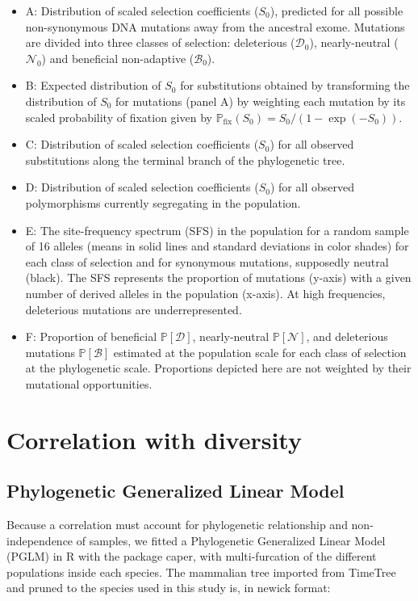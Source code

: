 \documentclass{article}
\newcommand{\proba}{\mathbb{P}}
\newcommand{\Sphy}{S_{0}}
\newcommand{\SphyDel}{\mathcal{D}_0}
\newcommand{\SphyNeu}{\mathcal{N}_0}
\newcommand{\SphyBen}{\mathcal{B}_0}
\newcommand{\SpopDel}{\mathcal{D}}
\newcommand{\SpopNeu}{\mathcal{N}}
\newcommand{\SpopBen}{\mathcal{B}}
\newcommand{\ProbaPopDel}{\proba [ \SpopDel]}
\newcommand{\ProbaPopNeu}{\proba [ \SpopNeu ]}
\newcommand{\ProbaPopBen}{\proba [ \SpopBen ]}
\begin{document}
    \small
    \begin{itemize}[itemsep=0pt]
        \item A: Distribution of scaled selection coefficients ($\Sphy$), predicted for all possible non-synonymous DNA mutations away from the ancestral exome.
        Mutations are divided into three classes of selection: deleterious ($\SphyDel$), nearly-neutral ($\SphyNeu$) and beneficial non-adaptive ($\SphyBen$).
        \item B: Expected distribution of $\Sphy$ for substitutions obtained by transforming the distribution of $\Sphy$ for mutations (panel A) by weighting each mutation by its scaled probability of fixation given by $\proba_{\text{fix}} (\Sphy) = \Sphy/(1-\exp(-\Sphy))$.
        \item C: Distribution of scaled selection coefficients ($\Sphy$) for all observed substitutions along the terminal branch of the phylogenetic tree.
        \item D: Distribution of scaled selection coefficients ($\Sphy$) for all observed polymorphisms currently segregating in the population.
        \item E: The site-frequency spectrum (SFS) in the population for a random sample of 16 alleles (means in solid lines and standard deviations in color shades) for each class of selection and for synonymous mutations, supposedly neutral (black). The SFS represents the proportion of mutations (y-axis) with a given number of derived alleles in the population (x-axis). At high frequencies, deleterious mutations are underrepresented.
        \item F: Proportion of beneficial $\ProbaPopDel$, nearly-neutral $\ProbaPopNeu$, and deleterious mutations $\ProbaPopBen$  estimated at the population scale for each class of selection at the phylogenetic scale. Proportions depicted here are not weighted by their mutational opportunities.
    \end{itemize}
    \normalsize

    \newpage
    \section{Correlation with diversity}

    \subsection{Phylogenetic Generalized Linear Model}

    Because a correlation must account for phylogenetic relationship and non-independence of samples, we fitted a Phylogenetic Generalized Linear Model (PGLM) in R with the package caper\cite{orme_caper_2013}, with multi-furcation of the different populations inside each species.
    The mammalian tree imported from TimeTree\cite{kumar_timetree_2017} and pruned to the species used in this study is, in newick format:
\end{document}
